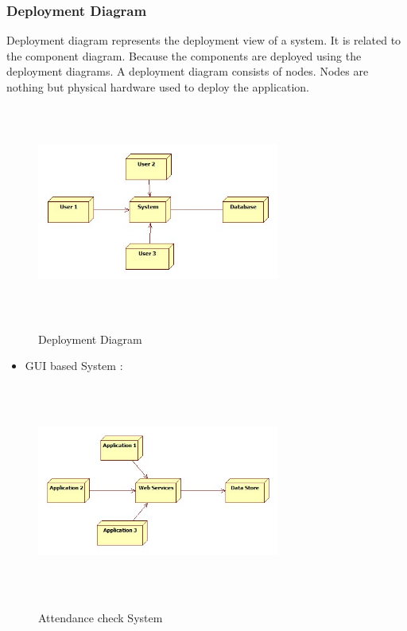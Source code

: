 \subsubsection{Deployment Diagram}
\hspace*{0.7in} Deployment diagram represents the deployment view of a system. It is related to the component diagram. Because the components are deployed using the deployment diagrams. A deployment diagram consists of nodes. Nodes are nothing but physical hardware used to deploy the application.

\begin{figure}[h]
\centering
  \includegraphics[width=8cm,height=7cm]{Fig19.jpg}\\
  \caption{Deployment Diagram}
  \label{Deployment Diagram}
\end{figure}
\newpage
\begin{itemize}
  \item GUI based  System :
\end{itemize}

\begin{figure}[h]
\centering
  \includegraphics[width=8cm,height=7cm]{Fig20.jpg}\\
  \caption{Attendance check  System}
  \label{Attendance check  System}
\end{figure}
